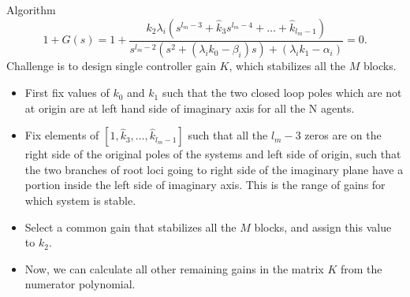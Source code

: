 	\begin{frame}{Algorithm}
		$$1+G(s)= 1+ \frac{k_{2}\lambda_{i}(s^{l_{m}-3}+\hat{k}_{3}s^{l_{m}-4}+\dots+\hat{k}_{l_{m}-1})}{s^{l_{m}-2}(s^2 + (\lambda_{i}k_{0}-\beta_{i})s)+(\lambda_{i}k_{1}-\alpha_{i})}=0.$$
		Challenge is to design single controller gain $K$, which stabilizes all the $M$ blocks.
		\begin{block}{}
			\begin{itemize}
				\item First fix values of $k_{0}$ and $k_{1}$ such that the two closed loop poles which are not at origin are at left hand side of imaginary axis for all the N agents.
				\item Fix elements of $[1, \hat{k}_{3},\dots, \hat{k}_{l_{m}-1}]$ such that all the $l_{m}-3$ zeros are on the right side of the original poles of the systems and left side of origin, such that the two branches of root loci going to right side of the imaginary plane have a portion inside the left side of imaginary axis. This is the range of gains for which system is stable.
				\item Select a common gain that stabilizes all the $M$ blocks, and assign this value to $k_{2}$.
				\item Now, we can calculate all other remaining gains in the matrix  $K$ from the numerator polynomial.
			\end{itemize} 
		\end{block}
	\end{frame}

